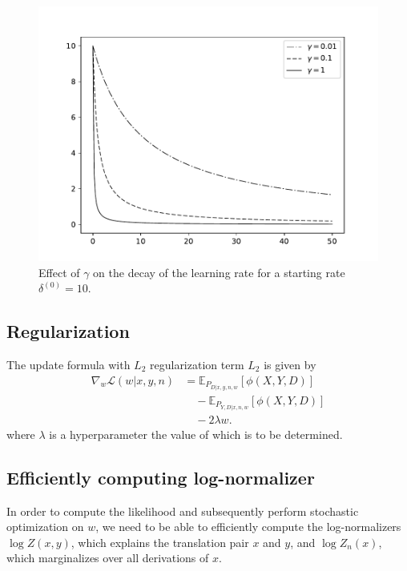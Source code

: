 \documentclass[11pt,a4paper]{article}
\begin{document}
\begin{figure}[H]
    \centering
    \includegraphics[width=\linewidth]{images/learning-rates.pdf}
    \caption{Effect of $\gamma$ on the decay of the learning rate for a starting rate $\delta^{(0)} = 10$.}
    \label{fig:learning-rates}
\end{figure}



\subsection{Regularization}

The update formula with $L_2$ regularization term $L_2$ is given by
\begin{align*}
\nabla_w\mathcal{L}(w|x,y,n) 
    &=\mathbb{E}_{P_{D|x,y,n,w}}[\phi(X,Y,D)] \\
    &\quad-\mathbb{E}_{P_{Y, D|x,n,w}}[\phi(X,Y,D)] \\
    &\quad- 2\lambda w.
\end{align*}
where $\lambda$ is a hyperparameter the value of which is to be  determined.


\subsection{Efficiently computing log-normalizer}

In order to compute the likelihood and subsequently perform stochastic optimization on $w$, we need to be able to efficiently compute the log-normalizers $\log Z(x, y)$, which explains the translation pair $x$ and $y$, and $\log Z_n(x)$, which marginalizes over all derivations of $x$. 
\end{document}
